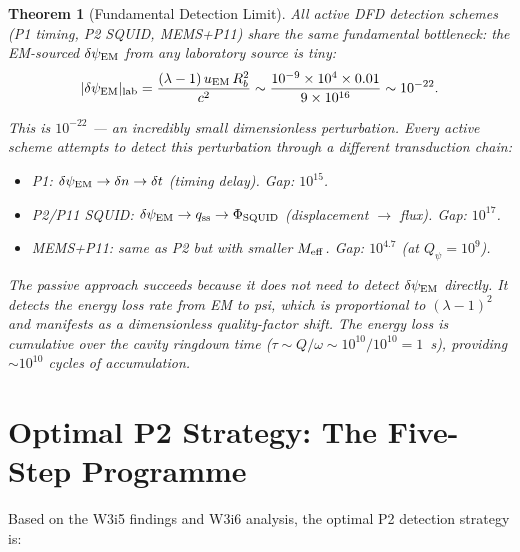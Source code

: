 \documentclass[11pt]{article}
\newcommand{\lam}{\lambda}
\newcommand{\Meff}{M_{\rm eff}}
\newcommand{\ee}[1]{\times 10^{#1}}
\newcommand{\Qpsi}{Q_\psi}
\newcommand{\dpsiEM}{\delta\psi_{\rm EM}}
\newtheorem{theorem}{Theorem}[section]
\theoremstyle{definition}
\theoremstyle{remark}
\begin{document}
\begin{theorem}[Fundamental Detection Limit]
\label{thm:fundamental_limit}
All active DFD detection schemes (P1 timing, P2 SQUID, MEMS+P11) share
the same fundamental bottleneck: the EM-sourced $\dpsiEM$ from any
laboratory source is tiny:
\begin{equation}
|\dpsiEM|_{\rm lab} = \frac{(\lam-1)\,u_{\rm EM}\,R_b^2}{c^2}
\sim \frac{10^{-9}\times 10^4\times 0.01}{9\ee{16}}
\sim 10^{-22}.
\label{eq:dpsiEM_lab}
\end{equation}

This is $10^{-22}$ --- an incredibly small dimensionless perturbation.
Every active scheme attempts to detect this perturbation through a
different transduction chain:
\begin{itemize}[nosep]
\item P1: $\dpsiEM \to \delta n \to \delta t$ (timing delay). Gap: $10^{15}$.
\item P2/P11 SQUID: $\dpsiEM \to q_{\rm ss} \to \Phi_{\rm SQUID}$
  (displacement $\to$ flux). Gap: $10^{17}$.
\item MEMS+P11: same as P2 but with smaller $\Meff$. Gap: $10^{4.7}$
  (at $\Qpsi = 10^9$).
\end{itemize}

The passive approach succeeds because it does not need to detect
$\dpsiEM$ directly. It detects the \emph{energy loss rate} from EM to
psi, which is proportional to $(\lam-1)^2$ and manifests as a
dimensionless quality-factor shift. The energy loss is cumulative over
the cavity ringdown time ($\tau \sim Q/\omega \sim 10^{10}/10^{10} = 1$~s),
providing $\sim 10^{10}$ cycles of accumulation.
\end{theorem}

\section{Optimal P2 Strategy: The Five-Step Programme}
\label{sec:five_step}

Based on the W3i5 findings and W3i6 analysis, the optimal P2 detection
strategy is:
\end{document}
